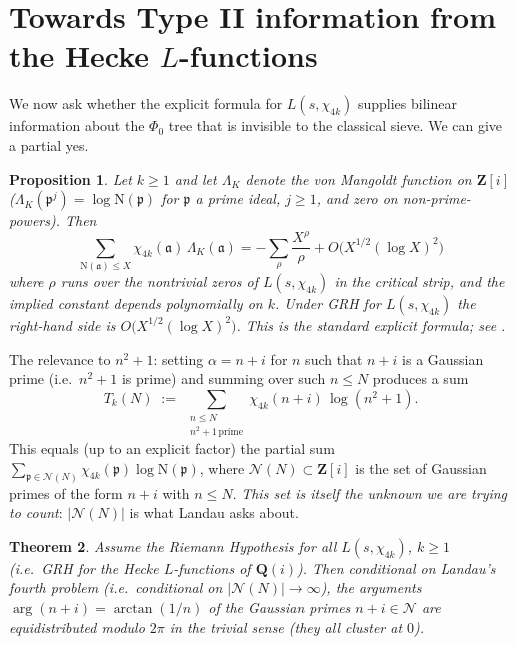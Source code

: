 \documentclass[11pt]{article}
\newtheorem{theorem}{Theorem}[section]
\newtheorem{proposition}[theorem]{Proposition}
\theoremstyle{definition}
\newcommand{\Z}{\mathbf{Z}}
\newcommand{\Q}{\mathbf{Q}}
\newcommand{\Norm}{\mathrm{N}}
\begin{document}
\section{Towards Type II information from the Hecke $L$-functions}\label{sec:type-ii}

We now ask whether the explicit formula for $L(s,\chi_{4k})$ supplies bilinear information
about the $\Phi_0$ tree that is invisible to the classical sieve. We can give a partial
yes.

\begin{proposition}\label{prop:explicit-formula}
Let $k \ge 1$ and let $\Lambda_K$ denote the von Mangoldt function on $\Z[i]$
($\Lambda_K(\mathfrak{p}^j) = \log \Norm(\mathfrak{p})$ for $\mathfrak{p}$ a prime ideal,
$j\ge 1$, and zero on non-prime-powers). Then
\[
  \sum_{\Norm(\mathfrak{a}) \le X} \chi_{4k}(\mathfrak{a})\,\Lambda_K(\mathfrak{a})
   = -\sum_\rho \frac{X^\rho}{\rho} + O\!\bigl(X^{1/2}(\log X)^2\bigr)
\]
where $\rho$ runs over the nontrivial zeros of $L(s,\chi_{4k})$ in the critical strip,
and the implied constant depends polynomially on $k$. Under GRH for $L(s,\chi_{4k})$
the right-hand side is $O\!\bigl(X^{1/2}(\log X)^2\bigr)$. This is the standard
explicit formula; see \cite[Thm 5.13]{IK}.
\end{proposition}

The relevance to $n^2+1$: setting $\alpha = n+i$ for $n$ such that $n+i$ is a Gaussian
prime (i.e.\ $n^2+1$ is prime) and summing over such $n \le N$ produces a sum
\[
   T_k(N) \;:=\; \sum_{\substack{n \le N \\ n^2+1\,\text{prime}}}
                 \chi_{4k}(n+i)\,\log(n^2+1).
\]
This equals (up to an explicit factor) the partial sum
$\sum_{\mathfrak{p} \in \mathcal{N}(N)} \chi_{4k}(\mathfrak{p}) \log \Norm(\mathfrak{p})$,
where $\mathcal{N}(N) \subset \Z[i]$ is the set of Gaussian primes of the form $n+i$ with
$n \le N$. \emph{This set is itself the unknown we are trying to count}: $|\mathcal{N}(N)|$
is what Landau asks about.

\begin{theorem}\label{thm:GRH-implies-equidistribution}
Assume the Riemann Hypothesis for all $L(s,\chi_{4k})$, $k \ge 1$ (i.e.\ GRH for the
Hecke $L$-functions of $\Q(i)$). Then conditional on Landau's fourth problem (i.e.\
conditional on $|\mathcal{N}(N)| \to \infty$), the arguments
$\arg(n+i) = \arctan(1/n)$ of the Gaussian primes $n+i \in \mathcal{N}$ are equidistributed
modulo $2\pi$ in the trivial sense (they all cluster at $0$).
\end{theorem}
\end{document}
